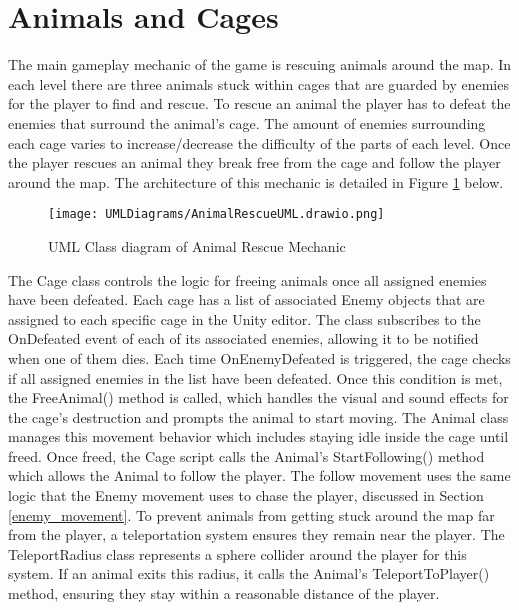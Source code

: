 \documentclass[10pt]{final_report}
\begin{document}
\section{Animals and Cages}
The main gameplay mechanic of the game is rescuing animals around the map. In each level there are three animals stuck within cages that are guarded by enemies for the player to find and rescue. To rescue an animal the player has to defeat the enemies that surround the animal's cage. The amount of enemies surrounding each cage varies to increase/decrease the difficulty of the parts of each level. Once the player rescues an animal they break free from the cage and follow the player around the map. The architecture of this mechanic is detailed in Figure \ref{fig:label_rescue} below. 
\begin{figure}[H]
    \centering
    \texttt{[image: UMLDiagrams/AnimalRescueUML.drawio.png]}
    \caption{UML Class diagram of Animal Rescue Mechanic}
    \label{fig:label_rescue}
\end{figure}
The Cage class controls the logic for freeing animals once all assigned enemies have been defeated. Each cage has a list of associated Enemy objects that are assigned to each specific cage in the Unity editor. The class subscribes to the OnDefeated event of each of its associated enemies, allowing it to be notified when one of them dies. Each time OnEnemyDefeated is triggered, the cage checks if all assigned enemies in the list have been defeated. Once this condition is met, the FreeAnimal() method is called, which handles the visual and sound effects for the cage's destruction and prompts the animal to start moving. The Animal class manages this movement behavior which includes staying idle inside the cage until freed. Once freed, the Cage script calls the Animal's StartFollowing() method which allows the Animal to follow the player. The follow movement uses the same logic that the Enemy movement uses to chase the player, discussed in Section \ref{enemy_movement}. To prevent animals from getting stuck around the map far from the player, a teleportation system ensures they remain near the player. The TeleportRadius class represents a sphere collider around the player for this system. If an animal exits this radius, it calls the Animal's TeleportToPlayer() method, ensuring they stay within a reasonable distance of the player.

\end{document}
